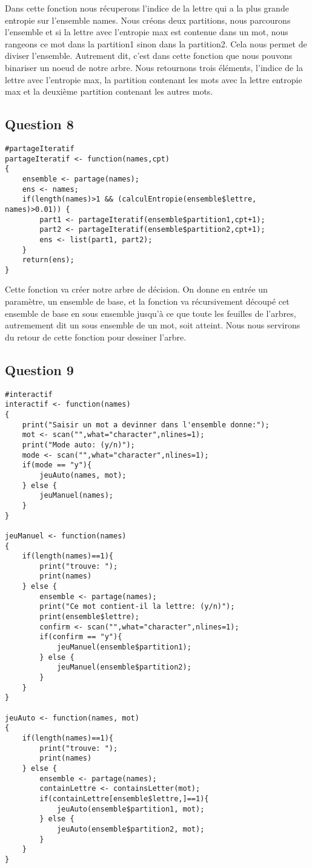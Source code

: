 \documentclass[a4paper,12pt]{report}
\begin{document}
Dans cette fonction nous récuperons l'indice de la lettre qui a la plus grande entropie sur l'ensemble names. Nous créons deux partitions, nous parcourons l'ensemble et si la lettre avec l'entropie max est contenue dans un mot, nous rangeons ce mot dans la partition1 sinon dans la partition2. Cela nous permet de diviser l'ensemble. Autrement dit, c'est dans cette fonction que nous pouvons binariser un noeud de notre arbre. Nous retournons trois éléments, l'indice de la lettre avec l'entropie max, la partition contenant les mots avec la lettre entropie max et la deuxième partition contenant les autres mots.

\subsection*{Question 8}

\begin{lstlisting}
#partageIteratif
partageIteratif <- function(names,cpt)
{
	ensemble <- partage(names);
	ens <- names;
	if(length(names)>1 && (calculEntropie(ensemble$lettre, names)>0.01)) { 
		part1 <- partageIteratif(ensemble$partition1,cpt+1);
		part2 <- partageIteratif(ensemble$partition2,cpt+1);
		ens <- list(part1, part2);
	}
	return(ens);
}
\end{lstlisting}

Cette fonction va créer notre arbre de décision. On donne en entrée un paramètre, un ensemble de base, et la fonction va récursivement découpé cet ensemble de base en sous ensemble jusqu'à ce que toute les feuilles de l'arbres, autremement dit un sous ensemble de un mot, soit atteint. Nous nous servirons du retour de cette fonction pour dessiner l'arbre.

\newpage

\subsection*{Question 9}

\begin{lstlisting}
#interactif
interactif <- function(names)
{
	print("Saisir un mot a devinner dans l'ensemble donne:");
	mot <- scan("",what="character",nlines=1);
	print("Mode auto: (y/n)");
	mode <- scan("",what="character",nlines=1);
	if(mode == "y"){
		jeuAuto(names, mot);
	} else {
		jeuManuel(names);			
	}
}

jeuManuel <- function(names)
{
	if(length(names)==1){
		print("trouve: ");
		print(names)
	} else {
		ensemble <- partage(names);
		print("Ce mot contient-il la lettre: (y/n)");
		print(ensemble$lettre);
		confirm <- scan("",what="character",nlines=1);
		if(confirm == "y"){
			jeuManuel(ensemble$partition1);
		} else {
			jeuManuel(ensemble$partition2);			
		}		
	}
}

jeuAuto <- function(names, mot)
{
	if(length(names)==1){
		print("trouve: ");
		print(names)
	} else {
		ensemble <- partage(names);
		containLettre <- containsLetter(mot);
		if(containLettre[ensemble$lettre,]==1){
			jeuAuto(ensemble$partition1, mot);
		} else {
			jeuAuto(ensemble$partition2, mot);			
		}		
	}
}
\end{lstlisting}
\end{document}
